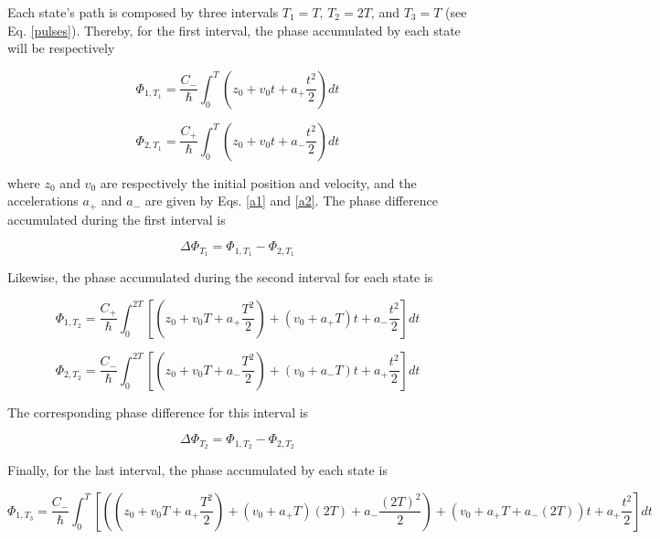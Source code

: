 \documentclass{article}
\begin{document}
Each state's path is composed by three intervals $T_{1}=T$, $T_{2}=2T$, and $T_{3}=T$ (see Eq. \ref{pulses}). Thereby, for the first interval, the phase accumulated by each state will be respectively

\begin{equation}\label{phi1t1}
\Phi_{1, T_{1}} = \frac{C_{-}}{\hbar} \int_{0}^{T} (z_{0}+v_{0}t+a_{+} \frac{t^{2}}{2})dt
\end{equation}

\begin{equation}
\Phi_{2, T_{1}} = \frac{C_{+}}{\hbar} \int_{0}^{T} (z_{0}+v_{0}t+a_{-} \frac{t^{2}}{2})dt
\end{equation}

where $z_{0}$ and $v_{0}$ are respectively the initial position and velocity,
and the accelerations $a_{+}$ and $a_{-}$ are given by Eqs. \ref{a1} and \ref{a2}. The phase difference accumulated during the first interval is

\begin{equation}
\Delta \Phi_{T_{1}} = \Phi_{1, T_{1}} - \Phi_{2, T_{1}}
\end{equation}

Likewise, the phase accumulated during the second interval for each state is

\begin{equation}
\Phi_{1, T_{2}} = \frac{C_{+}}{\hbar} \int_{0}^{2T} [(z_{0}+v_{0}T+a_{+} \frac{T^{2}}{2}) + (v_{0}+a_{+}T)t + a_{-} \frac{t^{2}}{2}]dt
\end{equation}

\begin{equation}
\Phi_{2, T_{2}} = \frac{C_{-}}{\hbar} \int_{0}^{2T} [(z_{0}+v_{0}T+a_{-} \frac{T^{2}}{2}) + (v_{0}+a_{-}T)t + a_{+} \frac{t^{2}}{2}]dt
\end{equation}

The corresponding phase difference for this interval is

\begin{equation}
\Delta \Phi_{T_{2}} = \Phi_{1, T_{2}} - \Phi_{2, T_{2}}
\end{equation}

Finally, for the last interval, the phase accumulated by each state is

\begin{equation}
\Phi_{1, T_{3}} = \frac{C_{-}}{\hbar} \int_{0}^{T} [((z_{0}+v_{0}T+a_{+} \frac{T^{2}}{2}) + (v_{0}+a_{+}T)(2T) + a_{-} \frac{(2T)^{2}}{2}) + (v_{0}+a_{+}T + a_{-}(2T))t + a_{+} \frac{t^{2}}{2}]dt
\end{equation}
\end{document}
